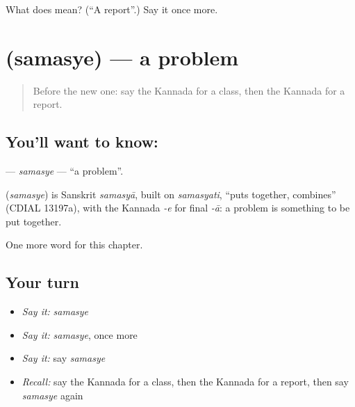 \begin{tcolorbox}[breakable,colback=teal!4,colframe=teal!35!black,title={Before you move on}]
What does  mean? (\textquotedblleft{}A report\textquotedblright{}.) Say it once more.
\end{tcolorbox}
\section[\texorpdfstring{\kn{ಸಮಸ್ಯೆ} (samasye)}{ಸಮಸ್ಯೆ (samasye)}]{ (samasye) — a problem}

\label{lesson:KA-C269-samasye}



\begin{quote}
Before the new one: say the Kannada for a class, then the Kannada for a report.
\end{quote}

\subsection*{You'll want to know: }
\textbf{} — \emph{samasye} — \textquotedblleft{}a problem\textquotedblright{}.

\begin{cousinweb}
\textbf{} (\emph{samasye}) is Sanskrit \emph{samasyā}, built on \emph{samasyati}, \textquotedblleft{}puts together, combines\textquotedblright{} (CDIAL 13197a), with the Kannada \emph{-e} for final \emph{-ā}: a problem is something to be put together.
\end{cousinweb}

\begin{grammarlens}[title={What you've built}]
One more word for this chapter.
\end{grammarlens}

\subsection*{Your turn}
\begin{itemize}
\raggedright
  \item \emph{Say it:} \emph{samasye}
  \item \emph{Say it:} \emph{samasye}, once more
  \item \emph{Say it:} say \emph{samasye}
  \item \emph{Recall:} say the Kannada for a class, then the Kannada for a report, then say \emph{samasye} again
\end{itemize}

